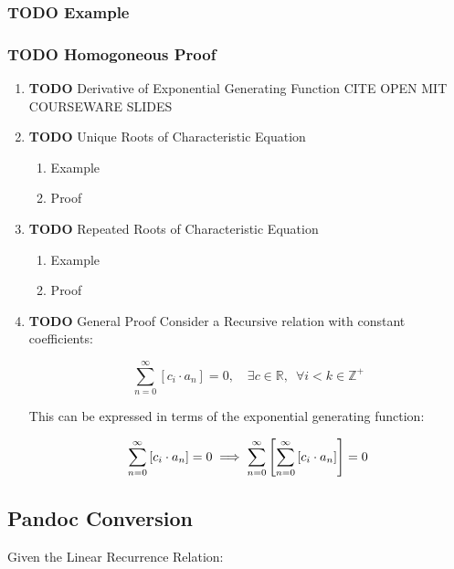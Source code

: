 \documentclass[11pt]{article}
\begin{document}
\subsubsection{{\bfseries\sffamily TODO} Example}
\label{sec:orgeed800d}
\subsubsection{{\bfseries\sffamily TODO} Homogoneous Proof}
\label{sec:orgc586201}
\begin{enumerate}
\item {\bfseries\sffamily TODO} Derivative of Exponential Generating Function
\label{sec:org90d342b}
CITE OPEN MIT COURSEWARE SLIDES
\item {\bfseries\sffamily TODO} Unique Roots of Characteristic Equation
\label{sec:org25a8b07}
\begin{enumerate}
\item Example
\label{sec:orgf6cf24d}
\item Proof
\label{sec:org7343115}
\end{enumerate}
\item {\bfseries\sffamily TODO} Repeated Roots of Characteristic Equation
\label{sec:org9f4e42e}
\begin{enumerate}
\item Example
\label{sec:org239bacf}
\item Proof
\label{sec:org0b2c4be}
\end{enumerate}

\item {\bfseries\sffamily TODO} General Proof
\label{sec:orgdd581ff}
Consider a Recursive relation with constant coefficients:

$$
\sum^{\infty}_{n= 0}   \left[ c_i \cdot  a_n \right] = 0, \quad \exists c \in
\mathbb{R}, \enspace \forall i<k\in\mathbb{Z}^+
$$

This can be expressed in terms of the exponential generating function:

$$
\sum^{\infty}_{n= 0}   \left[ c_i \cdot  a_n \right] = 0\\
\implies \sum^{\infty}_{n= 0}   \left[\sum^{\infty}_{n= 0}   \left[ c_i \cdot
a_n  \right]   \right] = 0
$$
\end{enumerate}

\subsection{Pandoc Conversion}
\label{sec:orgd3f3c89}
Given the Linear Recurrence Relation:
\end{document}
